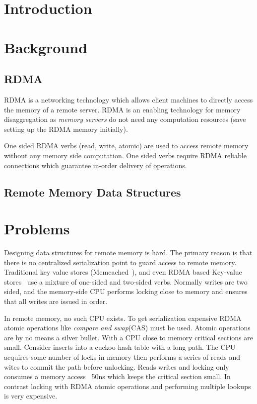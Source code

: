\section{Introduction}
\label{sec:intro}


\section{Background}
\label{sec:background}

\subsection{RDMA}

RDMA is a networking technology which allows client machines
to directly access the memory of a remote server. RDMA is an
enabling technology for memory disaggregation as
\textit{memory servers} do not need any computation
resources (save setting up the RDMA memory initially).

One sided RDMA verbs (read, write, atomic) are used to
access remote memory without any memory side computation.
One sided verbs require RDMA reliable connections which
guarantee in-order delivery of operations.


\subsection{Remote Memory Data Structures}

\section{Problems}
\label{sec:problems}

Designing data structures for remote memory is hard. The
primary reason is that there is no centralized serialization
point to guard access to remote memory. Traditional key
value stores (Memcached~\cite{memcached}), and even RDMA
based Key-value stores~\cite{herd,erpc,pilaf} use a mixture
of one-sided and two-sided verbs. Normally writes are two
sided, and the memory-side CPU performs locking close to
memory and ensures that all writes are issued in order.

In remote memory, no such CPU exists. To get serialization
expensive RDMA atomic operations like \textit{compare and
swap}(CAS) must be used. Atomic operations are by no means a
silver bullet. With a CPU close to memory critical sections
are small. Consider inserts into a cuckoo hash table with a
long path. The CPU acquires some number of locks in memory
then performs a series of reads and wites to commit the path
before unlocking. Reads writes and locking only consumes a
memory access ~50ns which keeps the critical section small.
In contrast locking with RDMA atomic operations and
performing multiple lookups is very expensive.

